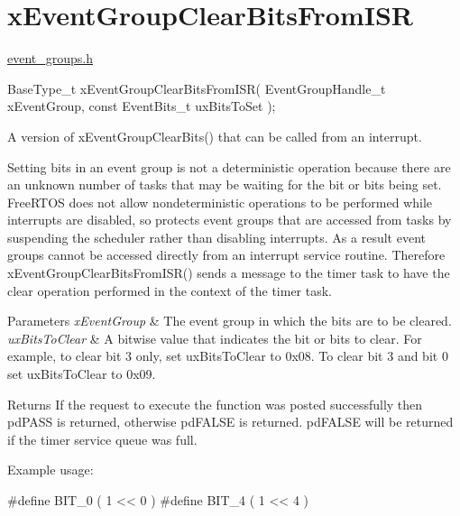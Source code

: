 \hypertarget{group__x_event_group_clear_bits_from_i_s_r}{}\section{x\+Event\+Group\+Clear\+Bits\+From\+I\+SR}
\label{group__x_event_group_clear_bits_from_i_s_r}
\mbox{\hyperlink{event__groups_8h_source}{event\+\_\+groups.\+h}} 
\begin{DoxyPre}
   BaseType\_t xEventGroupClearBitsFromISR( EventGroupHandle\_t xEventGroup, const EventBits\_t uxBitsToSet );
\end{DoxyPre}


A version of x\+Event\+Group\+Clear\+Bits() that can be called from an interrupt.

Setting bits in an event group is not a deterministic operation because there are an unknown number of tasks that may be waiting for the bit or bits being set. Free\+R\+T\+OS does not allow nondeterministic operations to be performed while interrupts are disabled, so protects event groups that are accessed from tasks by suspending the scheduler rather than disabling interrupts. As a result event groups cannot be accessed directly from an interrupt service routine. Therefore x\+Event\+Group\+Clear\+Bits\+From\+I\+S\+R() sends a message to the timer task to have the clear operation performed in the context of the timer task.


\begin{DoxyParams}{Parameters}
{\em x\+Event\+Group} & The event group in which the bits are to be cleared.\\
\hline
{\em ux\+Bits\+To\+Clear} & A bitwise value that indicates the bit or bits to clear. For example, to clear bit 3 only, set ux\+Bits\+To\+Clear to 0x08. To clear bit 3 and bit 0 set ux\+Bits\+To\+Clear to 0x09.\\
\hline
\end{DoxyParams}
\begin{DoxyReturn}{Returns}
If the request to execute the function was posted successfully then pd\+P\+A\+SS is returned, otherwise pd\+F\+A\+L\+SE is returned. pd\+F\+A\+L\+SE will be returned if the timer service queue was full.
\end{DoxyReturn}
Example usage\+: 
\begin{DoxyPre}
  \#define BIT\_0 ( 1 << 0 )
  \#define BIT\_4 ( 1 << 4 )\end{DoxyPre}



